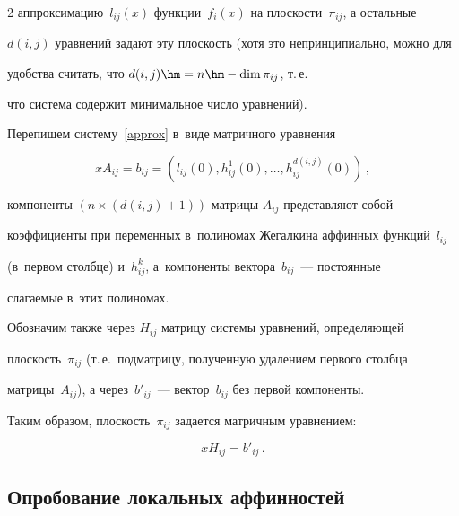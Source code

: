 \begin{multicols}{2}
аппроксимацию~$l_{ij}(x)$ функции~$f_i(x)$ на плос\-кости~$\pi_{ij}$, а остальные 


$d(i,j)$ уравнений задают эту плоскость (хотя это непринципиально, можно для 


удобства считать, что $d(i,j)\hm=n\hm-\mathrm{dim}\, \pi_{ij}$, т.\,е.\ 


что система содержит  минимальное число уравнений).








Перепишем систему~\eqref{approx} в~виде матричного уравнения


$$


xA_{ij} = b_{ij} = \left(l_{ij}(0),h_{ij}^1(0),\ldots,h_{ij}^{d(i,j)}(0)\right)\,,


$$


компоненты $\left(n\times(d(i,j)+1)\right)$-мат\-ри\-цы $A_{ij}$ представляют собой 


коэффициенты при переменных в~полиномах Жегалкина аффинных функций~$l_{ij}$ 


(в~первом столбце) и~$h_{ij}^k$, а~компоненты вектора~$b_{ij}$~--- постоянные 


слагаемые в~этих полиномах.





Обозначим также через $H_{ij}$ матрицу системы уравнений, определяющей 


плоскость~$\pi_{ij}$ (т.\,е.\ подматрицу, полученную удалением первого столбца 


матрицы~$A_{ij}$), а через~$b'_{ij}$~--- вектор~$b_{ij}$ без первой компоненты. 


Таким образом, плоскость~$\pi_{ij}$ задается матричным уравнением:


\begin{equation}


\label{flat-matrix-eq}


    xH_{ij}=b'_{ij}\,.


\end{equation}








\subsection{Опробование локальных аффинностей}






\end{multicols}
